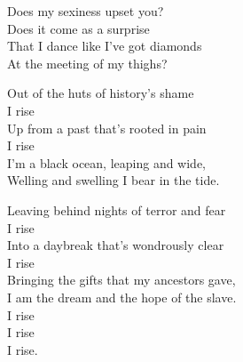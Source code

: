 \documentclass[12pt, openany, letterpaper]{memoir}
\begin{document}
\begin{minipage}[t]{0.49\linewidth}
	
	Does my sexiness upset you?\\
	Does it come as a surprise\\
	That I dance like I've got diamonds\\
	At the meeting of my thighs?
	
	Out of the huts of history’s shame\\
	I rise\\
	Up from a past that’s rooted in pain\\
	I rise\\
	I'm a black ocean, leaping and wide,\\
	Welling and swelling I bear in the tide.
	
	Leaving behind nights of terror and fear\\
	I rise\\
	Into a daybreak that’s wondrously clear\\
	I rise\\
	Bringing the gifts that my ancestors gave,\\
	I am the dream and the hope of the slave.\\
	I rise\\
	I rise\\
	I rise.	
	
\end{minipage}
\end{document}
